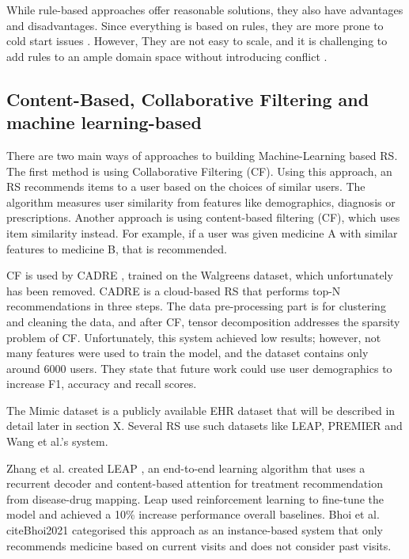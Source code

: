 While rule-based approaches offer reasonable solutions, they also have
advantages and disadvantages. Since everything is based on rules, they are
more prone to cold start issues \cite{PradeepKumarSingh2021}. However, They are
not easy to scale, and it is challenging to add rules to an ample domain space
without introducing conflict \cite{Bhoi2021}.

\subsection{
Content-Based, Collaborative Filtering and machine learning-based
}

There are two main ways of approaches to building Machine-Learning based
RS. The first method is using Collaborative Filtering (CF). Using this
approach, an RS recommends items to a user based on the choices of similar
users. The algorithm measures user similarity from features like
demographics, diagnosis or prescriptions. Another approach is using
content-based filtering (CF), which uses item similarity instead. For
example, if a user was given medicine A with similar features to medicine
B, that is recommended. 

CF is used by CADRE \cite{Zhang2015}, trained on the Walgreens dataset, which unfortunately has been removed. CADRE is a cloud-based RS that performs top-N recommendations in three steps. The data pre-processing
part is for clustering and cleaning the data, and after CF, tensor
decomposition addresses the sparsity problem of CF. Unfortunately, this
system achieved low results; however, not many features were used to train
the model, and the dataset contains only around 6000 users. They state
that future work could use user demographics to increase F1, accuracy and
recall scores.

The Mimic dataset is a publicly available EHR dataset that will be
described in detail later in section X. Several RS use such datasets like
LEAP, PREMIER and Wang et al.'s system. 


Zhang et al. \cite{LEAP} created LEAP , an end-to-end learning algorithm that uses a
recurrent decoder and content-based attention for treatment recommendation from
disease-drug mapping. Leap used reinforcement learning to fine-tune the model
and achieved a 10\% increase performance overall baselines. Bhoi et al. 
cite{Bhoi2021} categorised this approach as an instance-based system that
only recommends medicine based on current visits and does not consider past
visits. 

